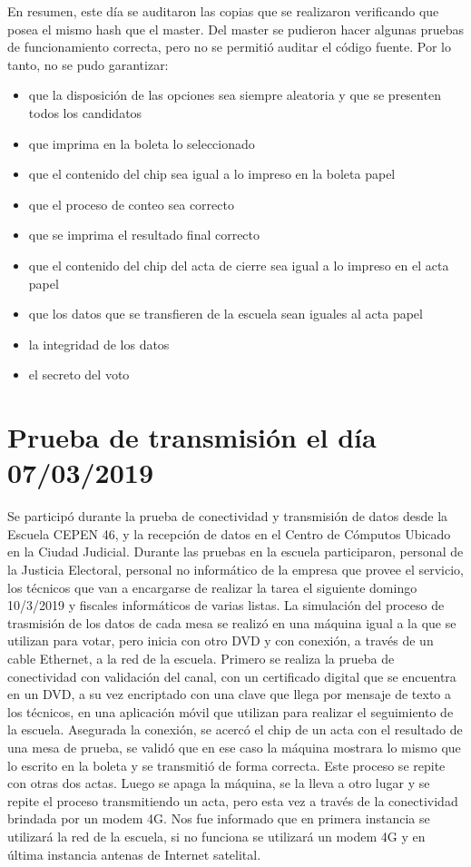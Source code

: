 En resumen, este día se auditaron las copias que se realizaron verificando que posea el mismo hash que el master.  Del master se pudieron hacer algunas pruebas de funcionamiento correcta, pero no se permitió auditar el código fuente. Por lo tanto, no se pudo garantizar: 
 \begin{itemize}
     \item que la disposición de las opciones sea siempre aleatoria y que se presenten todos los candidatos 
     \item que imprima en la boleta lo seleccionado 
     \item que el contenido del chip sea igual a lo impreso en la boleta papel 
     \item que el proceso de conteo sea correcto 
     \item que se imprima el resultado final correcto 
     \item que el contenido del chip del acta de cierre sea igual a lo impreso en el acta papel 
     \item que los datos que se transfieren de la escuela sean iguales al acta papel
     \item la integridad de los datos
     \item el secreto del voto
 \end{itemize}


\section{Prueba de transmisión el día 07/03/2019}
Se participó durante la prueba de conectividad y transmisión de datos desde la Escuela CEPEN 46, y la recepción de datos en el Centro de Cómputos Ubicado en la Ciudad Judicial.\newline
Durante las pruebas en la escuela participaron, personal de la Justicia Electoral, personal no informático de la empresa que provee el servicio, los técnicos que van a encargarse de realizar la tarea el siguiente domingo 10/3/2019 y fiscales informáticos de varias listas.\newline
La simulación del proceso de trasmisión de los datos de cada mesa se realizó en una máquina igual a la que se utilizan para votar, pero inicia con otro DVD y con conexión, a través de un cable Ethernet, a la red de la escuela. Primero se realiza la prueba de conectividad con validación del canal, con un certificado digital que se encuentra en un DVD, a su vez encriptado con una clave que llega por mensaje de texto a los técnicos, en una aplicación móvil que utilizan para realizar el seguimiento de la escuela.\newline
Asegurada la conexión, se acercó el chip de un acta con el resultado de una mesa de prueba, se validó que en ese caso la máquina mostrara lo mismo que lo escrito en la boleta y se transmitió de forma correcta. Este proceso se repite con otras dos actas. Luego se apaga la máquina, se la lleva a otro lugar y se repite el proceso transmitiendo un acta, pero esta vez a través de la conectividad brindada por un modem 4G.
Nos fue informado que en primera instancia se utilizará la red de la escuela, si no funciona se utilizará un modem 4G y en última instancia antenas de Internet satelital.\newline

